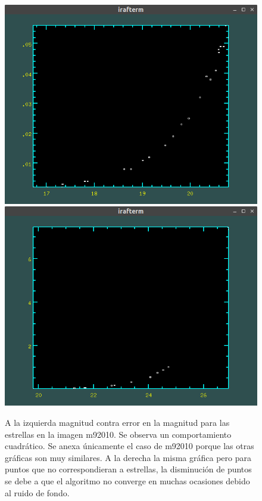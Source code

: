 \documentclass[12pt]{article}
\begin{document}
\begin{figure}[H]
   \includegraphics[scale=0.4]{mvsdm0.png}
   \includegraphics[scale=0.4]{mvsdm1.png}

  \caption{ A la izquierda magnitud contra error en la magnitud para las estrellas en la imagen m92010. Se observa un comportamiento cuadrático. Se anexa únicamente el caso de m92010 porque las otras gráficas son muy similares. A la derecha la misma gráfica pero para puntos que no correspondieran a estrellas, la disminución de puntos se debe a que el algoritmo no converge en muchas ocasiones debido al ruido de fondo.}
  \label{im5}
\end{figure}
\end{document}
